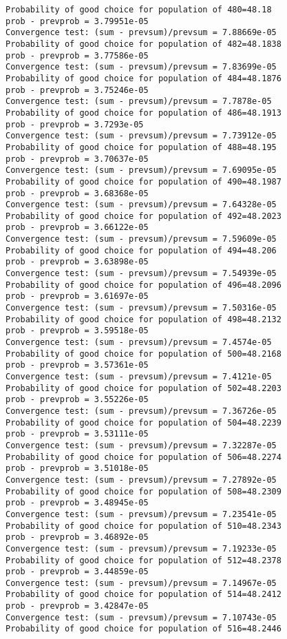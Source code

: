 \documentclass[11pt,onecolumn]{article}
\begin{document}
\begin{verbatim}
Probability of good choice for population of 480=48.18
prob - prevprob = 3.79951e-05
Convergence test: (sum - prevsum)/prevsum = 7.88669e-05
Probability of good choice for population of 482=48.1838
prob - prevprob = 3.77586e-05
Convergence test: (sum - prevsum)/prevsum = 7.83699e-05
Probability of good choice for population of 484=48.1876
prob - prevprob = 3.75246e-05
Convergence test: (sum - prevsum)/prevsum = 7.7878e-05
Probability of good choice for population of 486=48.1913
prob - prevprob = 3.7293e-05
Convergence test: (sum - prevsum)/prevsum = 7.73912e-05
Probability of good choice for population of 488=48.195
prob - prevprob = 3.70637e-05
Convergence test: (sum - prevsum)/prevsum = 7.69095e-05
Probability of good choice for population of 490=48.1987
prob - prevprob = 3.68368e-05
Convergence test: (sum - prevsum)/prevsum = 7.64328e-05
Probability of good choice for population of 492=48.2023
prob - prevprob = 3.66122e-05
Convergence test: (sum - prevsum)/prevsum = 7.59609e-05
Probability of good choice for population of 494=48.206
prob - prevprob = 3.63898e-05
Convergence test: (sum - prevsum)/prevsum = 7.54939e-05
Probability of good choice for population of 496=48.2096
prob - prevprob = 3.61697e-05
Convergence test: (sum - prevsum)/prevsum = 7.50316e-05
Probability of good choice for population of 498=48.2132
prob - prevprob = 3.59518e-05
Convergence test: (sum - prevsum)/prevsum = 7.4574e-05
Probability of good choice for population of 500=48.2168
prob - prevprob = 3.57361e-05
Convergence test: (sum - prevsum)/prevsum = 7.4121e-05
Probability of good choice for population of 502=48.2203
prob - prevprob = 3.55226e-05
Convergence test: (sum - prevsum)/prevsum = 7.36726e-05
Probability of good choice for population of 504=48.2239
prob - prevprob = 3.53111e-05
Convergence test: (sum - prevsum)/prevsum = 7.32287e-05
Probability of good choice for population of 506=48.2274
prob - prevprob = 3.51018e-05
Convergence test: (sum - prevsum)/prevsum = 7.27892e-05
Probability of good choice for population of 508=48.2309
prob - prevprob = 3.48945e-05
Convergence test: (sum - prevsum)/prevsum = 7.23541e-05
Probability of good choice for population of 510=48.2343
prob - prevprob = 3.46892e-05
Convergence test: (sum - prevsum)/prevsum = 7.19233e-05
Probability of good choice for population of 512=48.2378
prob - prevprob = 3.44859e-05
Convergence test: (sum - prevsum)/prevsum = 7.14967e-05
Probability of good choice for population of 514=48.2412
prob - prevprob = 3.42847e-05
Convergence test: (sum - prevsum)/prevsum = 7.10743e-05
Probability of good choice for population of 516=48.2446

\end{verbatim}
\end{document}
